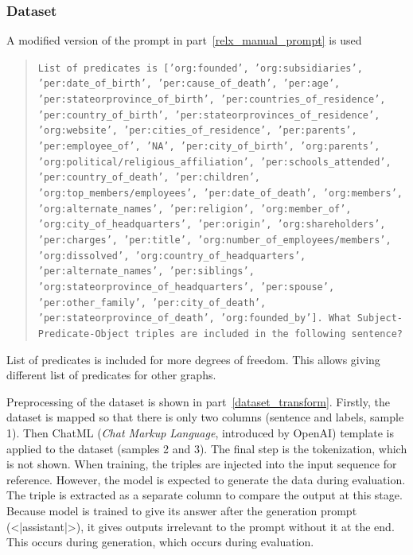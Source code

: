 \documentclass{article}
\begin{document}
\subsubsection{Dataset}
A modified version of the prompt in part~\ref{relx_manual_prompt} is used
\begin{quote}
    \texttt{List of predicates is ['org:founded', 'org:subsidiaries', 'per:date\_of\_birth', 'per:cause\_of\_death', 'per:age', 'per:stateorprovince\_of\_birth', 'per:countries\_of\_residence', 'per:country\_of\_birth', 'per:stateorprovinces\_of\_residence', 'org:website', 'per:cities\_of\_residence', 'per:parents', 'per:employee\_of', 'NA', 'per:city\_of\_birth', 'org:parents', 'org:political/religious\_affiliation', 'per:schools\_attended', 'per:country\_of\_death', 'per:children', 'org:top\_members/employees', 'per:date\_of\_death', 'org:members', 'org:alternate\_names', 'per:religion', 'org:member\_of', 'org:city\_of\_headquarters', 'per:origin', 'org:shareholders', 'per:charges', 'per:title', 'org:number\_of\_employees/members', 'org:dissolved', 'org:country\_of\_headquarters', 'per:alternate\_names', 'per:siblings', 'org:stateorprovince\_of\_headquarters', 'per:spouse', 'per:other\_family', 'per:city\_of\_death', 'per:stateorprovince\_of\_death', 'org:founded\_by']. What Subject-Predicate-Object triples are included in the following sentence?}
\end{quote}
List of predicates is included for more degrees of freedom. This allows giving different list of predicates for other graphs.

Preprocessing of the dataset is shown in part~\ref{dataset_transform}. Firstly, the dataset is mapped so that there is only two columns (sentence and labels, sample 1). Then ChatML (\textit{Chat Markup Language}, introduced by OpenAI) template is applied to the dataset (samples 2 and 3). The final step is the tokenization, which is not shown. When training, the triples are injected into the input sequence for reference. However, the model is expected to generate the data during evaluation. The triple is extracted as a separate column to compare the output at this stage. Because model is trained to give its answer after the generation prompt (<|assistant|>), it gives outputs irrelevant to the prompt without it at the end. This occurs during generation, which occurs during evaluation.
\end{document}
